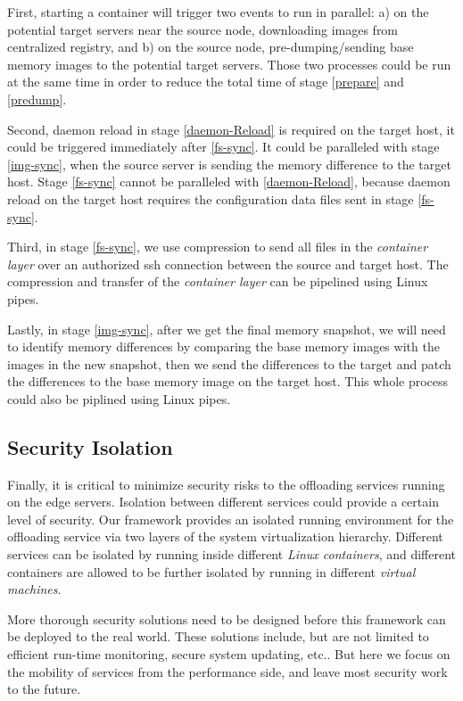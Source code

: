 
First, starting a container will trigger two events to run in parallel: a) on the potential target servers near the source node, downloading  images from centralized registry, and b) on the source node, pre-dumping/sending base memory images to the potential target servers. Those two processes could be run at the same time in order to reduce the total time of stage \ref{prepare} and \ref{predump}. 

Second, daemon reload in stage \ref{daemon-Reload} is required on the target host, it could be triggered immediately after \ref{fs-sync}. It could be paralleled with stage \ref{img-sync}, when the source server is sending the memory difference to the target host. Stage \ref{fs-sync} cannot be paralleled with \ref{daemon-Reload}, because daemon reload on the target host requires the configuration data files sent in stage \ref{fs-sync}.

Third,
in stage \ref{fs-sync}, we use compression to send all files in the \textit{container layer} over an authorized ssh connection between the source and target host. The compression and transfer of the \textit{container layer} can be pipelined using Linux pipes.

Lastly, in stage \ref{img-sync}, after we get the final memory snapshot, we will need to identify memory differences by comparing the base memory images with the images in the new snapshot, then we send the differences to the target and patch the differences to the base memory image on the target host. This whole process could also be piplined using Linux pipes. 



\subsection{Security Isolation}

Finally, it is critical to minimize security risks to the offloading services running on the edge servers. Isolation between different services could provide a certain level of security. Our framework provides an isolated running environment for the offloading service via two layers of the system virtualization hierarchy. Different services can be isolated by running inside different \textit{Linux containers}, and different containers are allowed to be further isolated by running in different  \textit{virtual machines}. 

More thorough security solutions need to be designed before this framework can be deployed to the real world. These solutions include, but are not limited to efficient run-time monitoring, secure system updating, etc.. But here we focus on the mobility of services from the performance side, and leave most security work to the future.



